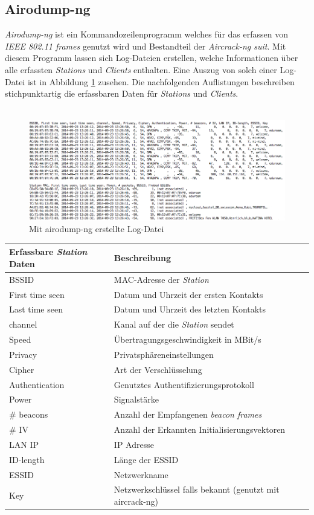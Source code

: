 \documentclass[]{report}
\begin{document}
\subsection{Airodump-ng}\label{lab:airodump-ng}
\textit{Airodump-ng}\cite{Airodump-ng} ist ein Kommandozeilenprogramm welches für das erfassen von \textit{IEEE 802.11 frames} genutzt wird und Bestandteil der \textit{Aircrack-ng suit}\cite{Aircrack-ng}. Mit diesem Programm lassen sich Log-Dateien erstellen, welche Informationen über alle erfassten \textit{Stations} und \textit{Clients} enthalten. Eine Auszug von solch einer Log-Datei ist in Abbildung \ref{fig:log_file} zusehen. Die nachfolgenden Auflistungen beschreiben stichpunktartig die erfassbaren Daten\cite{Airodump-ng} für \textit{Stations} und \textit{Clients}.\\ \\
\begin{figure}
    \centering
    \includegraphics[width=5.0in]{bilder/log.png}
    \caption{Mit airodump-ng erstellte Log-Datei}
    \label{fig:log_file}
\end{figure}
\begin{center}
  \begin{tabulary}{\textwidth}{l | L}
\toprule
Erfassbare \textit{Station} Daten & Beschreibung \\
\midrule
BSSID & MAC-Adresse der \textit{Station} \\
First time seen & Datum und Uhrzeit der ersten Kontakts \\
Last time seen & Datum und Uhrzeit des letzten Kontakts \\
channel &  Kanal auf der die \textit{Station} sendet \\
Speed & Übertragungsgeschwindigkeit in MBit/s\\
Privacy & Privatsphäreneinstellungen \\
Cipher & Art der Verschlüsselung \\
Authentication & Genutztes Authentifizierungsprotokoll \\
Power & Signalstärke \\ 
\# beacons & Anzahl der Empfangenen \textit{beacon frames}\\
\# IV & Anzahl der Erkannten Initialisierungsvektoren \\
LAN IP &  IP Adresse \\
ID-length & Länge der ESSID \\
ESSID & Netzwerkname \\
Key & Netzwerkschlüssel falls bekannt (genutzt mit aircrack-ng) \\
\bottomrule
\end{tabulary}
\end{center} 
\end{document}
